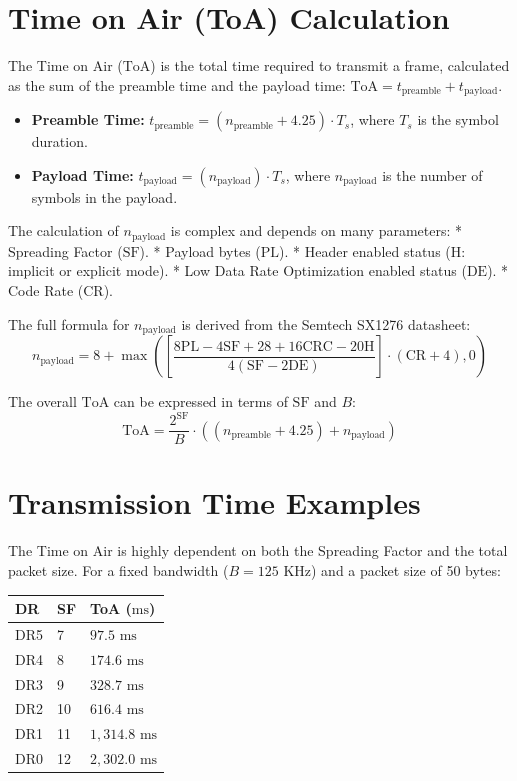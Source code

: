 \documentclass[a4paper, 12pt]{book} %
\begin{document}
\section{Time on Air (ToA)
Calculation}\label{time-on-air-toa-calculation}

The Time on Air (\(\text{ToA}\)) is the total time required to transmit
a frame, calculated as the sum of the preamble time and the payload
time: \(\text{ToA} = t_{\text{preamble}} + t_{\text{payload}}\).

\begin{itemize}
\tightlist
\item
  \textbf{Preamble Time:}
  \(t_{\text{preamble}} = (n_{\text{preamble}} + 4.25) \cdot T_s\),
  where \(T_s\) is the symbol duration.
\item
  \textbf{Payload Time:}
  \(t_{\text{payload}} = (n_{\text{payload}}) \cdot T_s\), where
  \(n_{\text{payload}}\) is the number of symbols in the payload.
\end{itemize}

The calculation of \(n_{\text{payload}}\) is complex and depends on many
parameters: * Spreading Factor (\(\text{SF}\)). * Payload bytes
(\(\text{PL}\)). * Header enabled status (\(\text{H}\): implicit or
explicit mode). * Low Data Rate Optimization enabled status
(\(\text{DE}\)). * Code Rate (\(\text{CR}\)).

The full formula for \(n_{\text{payload}}\) is derived from the Semtech
SX1276 datasheet:
\[n_{\text{payload}} = 8 + \max\left(\left[\frac{8\text{PL} - 4\text{SF} + 28 + 16\text{CRC} - 20\text{H}}{4(\text{SF} - 2\text{DE})}\right] \cdot (\text{CR} + 4), 0\right)\]

The overall \(\text{ToA}\) can be expressed in terms of \(\text{SF}\)
and \(B\):
\[\text{ToA} = \frac{2^{\text{SF}}}{B} \cdot \left((n_{\text{preamble}} + 4.25) + n_{\text{payload}}\right)\]

\section{Transmission Time Examples}\label{transmission-time-examples}

The Time on Air is highly dependent on both the Spreading Factor and the
total packet size. For a fixed bandwidth (\(B=125 \text{ KHz}\)) and a
packet size of 50 bytes:

\begin{longtable}[]{@{}lll@{}}
\toprule\noalign{}
DR & SF & ToA (\(\text{ms}\)) \\
\midrule\noalign{}
\endhead
\bottomrule\noalign{}
\endlastfoot
DR5 & 7 & \(97.5 \text{ ms}\) \\
DR4 & 8 & \(174.6 \text{ ms}\) \\
DR3 & 9 & \(328.7 \text{ ms}\) \\
DR2 & 10 & \(616.4 \text{ ms}\) \\
DR1 & 11 & \(1,314.8 \text{ ms}\) \\
DR0 & 12 & \(2,302.0 \text{ ms}\) \\
\end{longtable}
\end{document}
